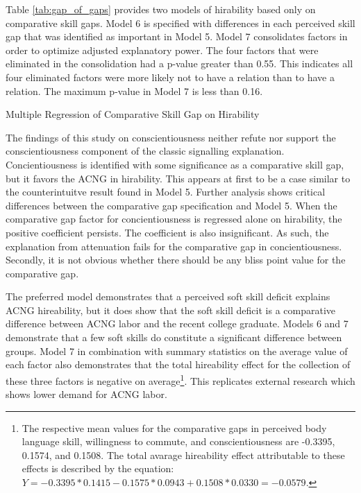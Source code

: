 \documentclass[review]{elsarticle}
\begin{document}
Table \ref{tab:gap_of_gaps} provides two models of hirability based only on comparative skill gaps.
Model 6 is specified with differences in each perceived skill gap that was identified as important in Model 5.
Model 7 consolidates factors in order to optimize adjusted explanatory power.
The four factors that were eliminated in the consolidation had a p-value greater than 0.55.
This indicates all four eliminated factors were more likely not to have a relation than to have a relation.
The maximum p-value in Model 7 is less than 0.16.

\begin{table}
    \caption{Multiple Regression of Comparative Skill Gap on Hirability}
    \resizebox{\columnwidth}{!}{
        
    }
    \label{tab:gap_of_gaps}
\end{table}

The findings of this study on conscientiousness neither refute nor support the conscientiousness component of the classic signalling explanation.
Concientiousness is identified with some significance as a comparative skill gap, but it favors the ACNG in hirability.
This appears at first to be a case similar to the counterintuitve result found in Model 5.
Further analysis shows critical differences between the comparative gap specification and Model 5.
When the comparative gap factor for concientiousness is regressed alone on hirability, the positive coefficient persists.
The coefficient is also insignificant.
As such, the explanation from attenuation fails for the comparative gap in concientiousness.
Secondly, it is not obvious whether there should be any bliss point value for the comparative gap.

The preferred model demonstrates that a perceived soft skill deficit explains ACNG hireability,
but it does show that the soft skill deficit is a comparative difference between ACNG labor and the recent college graduate.
Models 6 and 7 demonstrate that a few soft skills do constitute a significant difference between groups.
Model 7 in combination with summary statistics on the average value of each factor also demonstrates that
the total hireability effect for the collection of these three factors is negative on average\footnote{
    The respective mean values for the comparative gaps in perceived body language skill,
    willingness to commute,
    and conscientiousness
    are -0.3395, 0.1574, and 0.1508.
    The total avarage hireability effect attributable to these effects is described by the equation:
    $Y = -0.3395*0.1415 - 0.1575*0.0943 + 0.1508*0.0330 = -0.0579$.
}.
This replicates external research which shows lower demand for ACNG labor.
\end{document}
